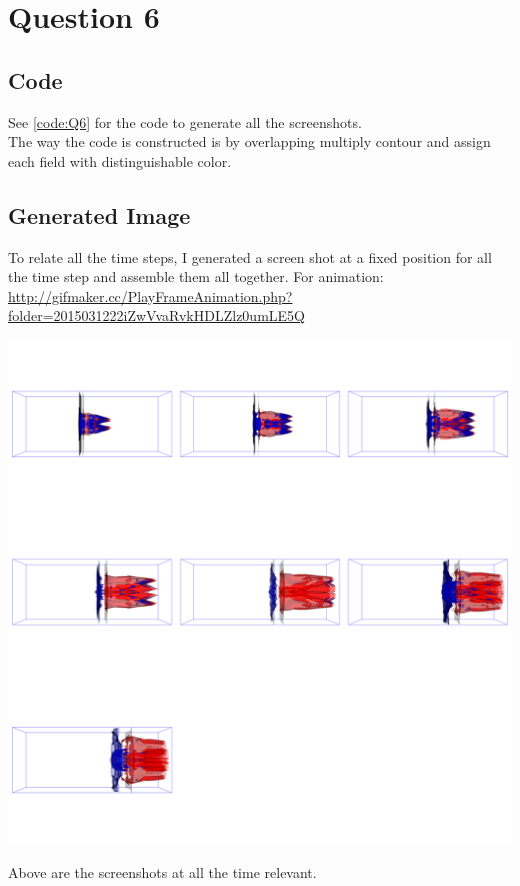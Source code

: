 \documentclass[11pt]{scrartcl}
\begin{document}
\section{Question 6}
\subsection{Code}
See \ref{code:Q6} for the code to generate all the screenshots.\\

The way the code is constructed is by overlapping multiply contour and assign each field with distinguishable color.

\subsection{Generated Image}
To relate all the time steps, I generated a screen shot at a fixed position for all the time step and assemble them all together. For animation: \url{http://gifmaker.cc/PlayFrameAnimation.php?folder=2015031222iZwVvaRvkHDLZlz0umLE5Q} \\

\begin{minipage}[t]{\linewidth}
{
\includegraphics[scale = 0.15]{img_6.png}

\centering
\medskip
{\footnotesize Above are the screenshots at all the time relevant.}
}
\end{minipage}
\end{document}
